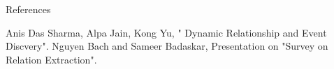\documentclass[10pt]{beamer}
\begin{document}
\begin{frame}{References}
  \begin{thebibliography}{99}
Anis Das Sharma, Alpa Jain, Kong Yu, " Dynamic Relationship and Event Discvery".
Nguyen Bach and Sameer Badaskar, Presentation on "Survey on Relation Extraction".
\end{thebibliography}
\end{frame}

\begin{frame}
\Large
\begin{center}
\end{center}
\end{frame}
\end{document}
